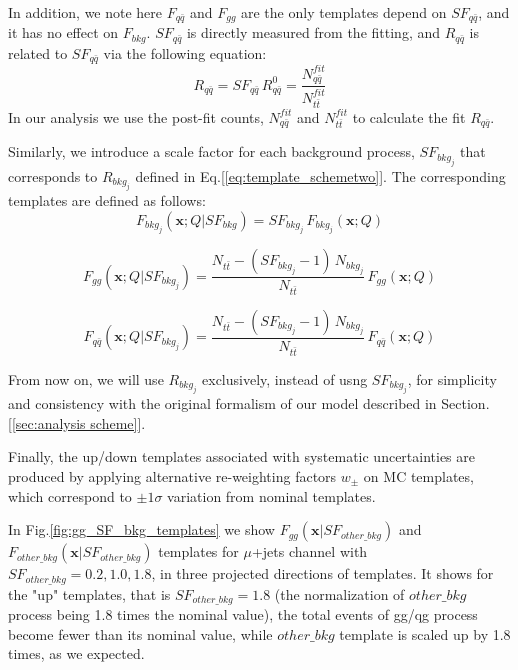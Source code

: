 In addition, we note here $F_{q\bar{q}}$ and $F_{gg}$ are the only templates depend on $SF_{q\bar{q}}$, and it has no effect on $F_{bkg}$. $SF_{q\bar{q}}$ is directly measured from the fitting, and $R_{q\bar{q}}$ is related to $SF_{q\bar{q}}$ via the following equation:
\begin{equation}
R_{q\bar{q}} = SF_{q\bar{q}}\,R_{q\bar{q}}^0 = \frac{N_{q\bar{q}}^{fit}}{N_{t\bar{t}}^{fit}}
\end{equation}
In our analysis we use the post-fit counts, $N_{q\bar{q}}^{fit}$ and $N_{t\bar{t}}^{fit}$ to calculate the fit $R_{q\bar{q}}$.

Similarly, we introduce a scale factor for each background process, $SF_{bkg_j}$ that corresponds to $R_{bkg_j}$ defined in Eq.[\ref{eq:template_schemetwo}]. The corresponding templates are defined as follows:
\begin{equation}
\label{eq:SF_bkg}
F_{bkg_j}(\bm{x};Q|SF_{bkg}) = SF_{bkg_j}\,F_{bkg_j}(\bm x ;Q) 
\end{equation}

\begin{equation}
F_{gg}(\bm{x};Q|SF_{bkg_j}) = \frac{N_{t\bar{t}}-(SF_{bkg_j}-1)\,N_{bkg_j}}{N_{t\bar{t}}}\,F_{gg}(\bm{x};Q)
\end{equation}

\begin{equation}
F_{q\bar{q}}(\bm{x};Q|SF_{bkg_j}) = \frac{N_{t\bar{t}}-(SF_{bkg_j}-1)\,N_{bkg_j}}{N_{t\bar{t}}}\,F_{q\bar{q}}(\bm{x};Q)
\end{equation}

From now on, we will use $R_{bkg_j}$ exclusively, instead of usng $SF_{bkg_j}$, for simplicity and consistency with the original formalism of our model described in Section.[\ref{sec:analysis scheme}].

Finally, the up/down templates associated with systematic uncertainties are produced by applying alternative re-weighting factors $w_{\pm}$ on MC templates, which correspond to $\pm 1 \sigma$ variation from nominal templates. 

In Fig.\ref{fig:gg_SF_bkg_templates} we show $F_{gg}(\bm{x}|SF_{other\_bkg})$ and $F_{other\_bkg}(\bm{x}|SF_{other\_bkg})$ templates for $\mu$+jets channel with $SF_{other\_bkg}= 0.2,1.0,1.8$, in three projected directions of templates. It shows for the "up" templates, that is $SF_{other\_bkg}=1.8$ (the normalization of $other\_bkg$ process being 1.8 times the nominal value), the total events of gg/qg process become fewer than its nominal value, while $other\_bkg$ template is scaled up by 1.8 times, as we expected.

